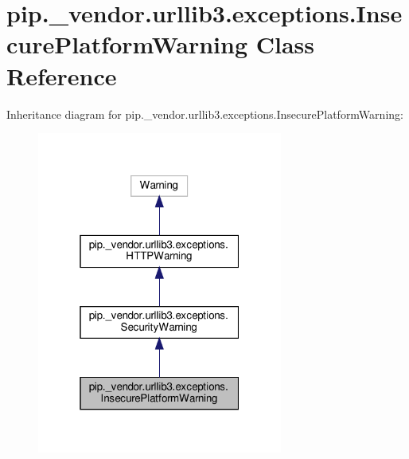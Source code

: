 \hypertarget{classpip_1_1__vendor_1_1urllib3_1_1exceptions_1_1InsecurePlatformWarning}{}\section{pip.\+\_\+vendor.\+urllib3.\+exceptions.\+Insecure\+Platform\+Warning Class Reference}
\label{classpip_1_1__vendor_1_1urllib3_1_1exceptions_1_1InsecurePlatformWarning}


Inheritance diagram for pip.\+\_\+vendor.\+urllib3.\+exceptions.\+Insecure\+Platform\+Warning\+:
\nopagebreak
\begin{figure}[H]
\begin{center}
\leavevmode
\includegraphics[width=229pt]{classpip_1_1__vendor_1_1urllib3_1_1exceptions_1_1InsecurePlatformWarning__inherit__graph}
\end{center}
\end{figure}


